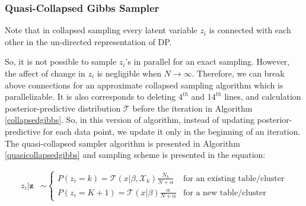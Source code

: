 \documentclass[a4paper]{article}
\begin{document}
\subsubsection{Quasi-Collapsed Gibbs Sampler}

Note that in collapsed sampling every latent variable $z_i$ is connected with each other in the un-directed representation of DP.

\begin{center}
\end{center}

So, it is not possible to sample $z_i$'s in parallel for an exact sampling. However, the affect of change in $z_i$ is negligible when $N \rightarrow \infty$. Therefore, we can break above connections for an approximate collapsed sampling algorithm which is parallelizable. It is also corresponds to deleting $4^{th}$ and $14^{th}$ lines, and calculation posterior-predictive distribution $\mathcal{T}$ before the iteration in Algorithm \ref{collapsedgibbs}. So, in this version of algorithm, instead of updating posterior-predictive for each data point, we update it only in the beginning of an iteration. The quasi-collapsed sampler algorithm is presented in Algorithm \ref{quasicollapsedgibbs} and sampling scheme is presented in the equation:

\begin{align*}
z_i|\boldsymbol z &\sim \begin{cases}
P(z_i=k)=\mathcal{T}(x|\beta,\mathcal{X}_{k})\frac{N_{k}}{N+\alpha} & \text{for an existing table/cluster} \\
P(z_i=K+1)=\mathcal{T}(x|\beta)\frac{\alpha}{N+\alpha} & \text{for a new table/cluster}
\end{cases}
\end{align*}
\end{document}
